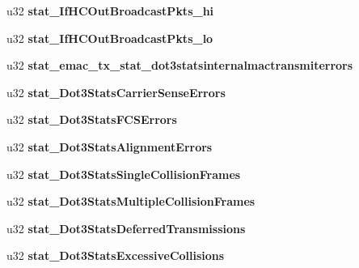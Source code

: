 \begin{DoxyCompactItemize}
\item 
\hypertarget{structstatistics__block_a89cdb608c6d6a9fd10caf18d0ccff34e}{
u32 {\bfseries stat\_\-IfHCOutBroadcastPkts\_\-hi}}
\label{structstatistics__block_a89cdb608c6d6a9fd10caf18d0ccff34e}

\item 
\hypertarget{structstatistics__block_acdbc54bba78b6da25cc27ab4ff67e72c}{
u32 {\bfseries stat\_\-IfHCOutBroadcastPkts\_\-lo}}
\label{structstatistics__block_acdbc54bba78b6da25cc27ab4ff67e72c}

\item 
\hypertarget{structstatistics__block_a8f7476d3385d9c468b4835146ea9ee5d}{
u32 {\bfseries stat\_\-emac\_\-tx\_\-stat\_\-dot3statsinternalmactransmiterrors}}
\label{structstatistics__block_a8f7476d3385d9c468b4835146ea9ee5d}

\item 
\hypertarget{structstatistics__block_a8df3f963b751e5db26eba3b149a23928}{
u32 {\bfseries stat\_\-Dot3StatsCarrierSenseErrors}}
\label{structstatistics__block_a8df3f963b751e5db26eba3b149a23928}

\item 
\hypertarget{structstatistics__block_a98ca8e4b1e09b7546b4232c9184678aa}{
u32 {\bfseries stat\_\-Dot3StatsFCSErrors}}
\label{structstatistics__block_a98ca8e4b1e09b7546b4232c9184678aa}

\item 
\hypertarget{structstatistics__block_a3aa61f05ae3df52de349b677335f2aec}{
u32 {\bfseries stat\_\-Dot3StatsAlignmentErrors}}
\label{structstatistics__block_a3aa61f05ae3df52de349b677335f2aec}

\item 
\hypertarget{structstatistics__block_a7e58f4954cb4afd282c03ce4ba2c1d6b}{
u32 {\bfseries stat\_\-Dot3StatsSingleCollisionFrames}}
\label{structstatistics__block_a7e58f4954cb4afd282c03ce4ba2c1d6b}

\item 
\hypertarget{structstatistics__block_a37a6573ba60eab22fd4ceb374bb3690c}{
u32 {\bfseries stat\_\-Dot3StatsMultipleCollisionFrames}}
\label{structstatistics__block_a37a6573ba60eab22fd4ceb374bb3690c}

\item 
\hypertarget{structstatistics__block_a10164bcce637504279aec2245e1013d3}{
u32 {\bfseries stat\_\-Dot3StatsDeferredTransmissions}}
\label{structstatistics__block_a10164bcce637504279aec2245e1013d3}

\item 
\hypertarget{structstatistics__block_ab32057a1ccd00956505de19ad6078b35}{
u32 {\bfseries stat\_\-Dot3StatsExcessiveCollisions}}
\label{structstatistics__block_ab32057a1ccd00956505de19ad6078b35}


\end{DoxyCompactItemize}
